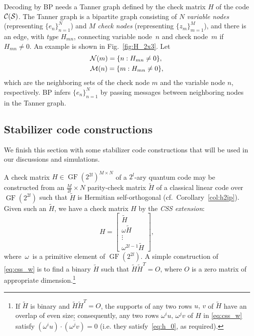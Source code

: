 \documentclass{ieeeaccess}
\DeclareMathOperator{\GF}{GF}
\newcommand{\sC}{{\cal C}}
\newcommand{\sM}{{\cal M}}
\newcommand{\sN}{{\cal N}}
\newcommand{\sS}{{\cal S}}
\let\emph\textit
\theoremstyle{definition}		%
\begin{document}
Decoding by BP needs a Tanner graph defined by the check matrix $H$ of the code $\sC(\sS)$.
%
The Tanner graph  is a bipartite graph consisting of $N$ \emph{variable nodes} (representing $\{e_n\}_{n=1}^N$) and $M$ \emph{check nodes} (representing $\{z_m\}_{m=1}^M$), and there is an edge, with \emph{type} $H_{mn}$, connecting variable node~$n$ and check node~$m$ if \mbox{$H_{mn}\ne 0$}. 
An example is shown in Fig.~\ref{fig:H_2x3}.
Let 
\begin{equation*}  
\begin{aligned}
& \sN(m) = \{n : H_{mn} \ne 0\},\\
& \sM(n) = \{m : H_{mn} \ne 0\},
\end{aligned}
\end{equation*}
which are the neighboring sets of the check node $m$ and the variable node $n$, respectively.  
%
BP infers $\{e_n\}_{n=1}^N$ by passing messages between neighboring nodes in the Tanner graph.






\subsection{Stabilizer code constructions}

We finish this section with some stabilizer code constructions that will be used in our discussions and simulations.

	A check matrix $H\in\GF(2^{2l})^{M\times N}$ of a $2^l$-ary quantum code may be constructed from an $\frac{M}{2l}\times N$  parity-check matrix $\tilde H$ of a classical linear code over $\GF(2^{2l})$ 
such that $\tilde H$ is Hermitian self-orthogonal (cf.~Corollary~\ref{col:h2ip}).
Given such an $\tilde H$, we have a check matrix $H$ by the \emph{CSS extension}:
\begin{equation} \label{eq:css_w}
H = \left[ \begin{smallmatrix} \tilde H \\ \omega\tilde H \\ \vdots\\ \omega^{2l-1}\tilde H \end{smallmatrix} \right],
\end{equation}
where~$\omega$~is a primitive element of $\GF(2^{2l})$.
%
A simple construction of \eqref{eq:css_w} is to find a binary $\tilde H$ such that ${\tilde H \tilde{H}^T = O}$,
where $O$ is a zero matrix of appropriate dimension.\footnote{
	If $\tilde H$ is binary and $\tilde H \tilde{H}^T = O$, the supports of any two rows $u,\, v$ of $\tilde H$ have an overlap of even size; 
	consequently, any two rows $\omega^i u,\, \omega^j v$ of $H$ in \eqref{eq:css_w} satisfy $(\omega^i u)\cdot\overline{(\omega^j v)} = 0$ 
	(i.e. they satisfy~\eqref{eq:h_0}, as required).
	}
\end{document}
